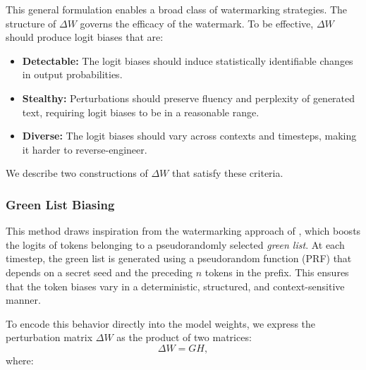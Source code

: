 This general formulation enables a broad class of watermarking strategies. The structure of \( \Delta W \) governs the efficacy of the watermark. To be effective, \( \Delta W \) should produce logit biases that are:
\begin{itemize}
    \item \textbf{Detectable:} The logit biases should induce statistically identifiable changes in output probabilities.
    \item \textbf{Stealthy:} Perturbations should preserve fluency and perplexity of generated text, requiring logit biases to be in a reasonable range.
    \item \textbf{Diverse:} The logit biases should vary across contexts and timesteps, making it harder to reverse-engineer.
\end{itemize}
We describe two constructions of \( \Delta W \) that satisfy these criteria.


\subsubsection{Green List Biasing}

This method draws inspiration from the watermarking approach of \citet{kirchenbauer2023watermark}, which boosts the logits of tokens belonging to a pseudorandomly selected \emph{green list}. At each timestep, the green list is generated using a pseudorandom function (PRF) that depends on a secret seed and the preceding \( n \) tokens in the prefix. This ensures that the token biases vary in a deterministic, structured, and context-sensitive manner.

To encode this behavior directly into the model weights, we express the perturbation matrix \( \Delta W \) as the product of two matrices:
\begin{equation}
    \Delta W = G H,
\end{equation}
where:

